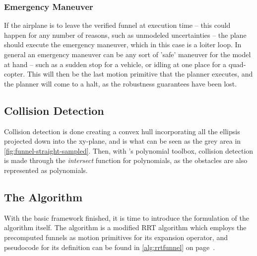 \subsubsection{Emergency Maneuver}

If the airplane is to leave the verified funnel at execution time -- this could
happen for any number of reasons, such as unmodeled uncertainties -- the plane
should execute the emergency maneuver, which in this case is a loiter loop. In
general an emergency maneuver can be any sort of 'safe' maneuver for the model
at hand -- such as a sudden stop for a vehicle, or idling at one place for a
quad-copter. This will then be the last motion primitive that the planner
executes, and the planner will come to a halt, as the robustness guarantees have
been lost.

\subsection{Collision Detection}

Collision detection is done creating a convex hull incorporating all the
ellipsis projected down into the xy-plane, and is what can be seen as the grey
area in \cref{fig:funnel-straight-sampled}. Then, with \matlab's polynomial
toolbox, collision detection is made through the \textit{intersect} function for
polynomials, as the obstacles are also represented as polynomials.


\subsection{The \rrtfunnel{} Algorithm}

With the basic framework finished, it is time to introduce the formulation of
the \rrtfunnel{} algorithm itself. The \rrtfunnel{} algorithm is a modified
\ac{RRT} algorithm which employs the precomputed funnels as motion primitives
for its expansion operator, and pseudocode for its definition can be found in
\cref{alg:rrtfunnel} on page~\pageref{alg:rrtfunnel}.

